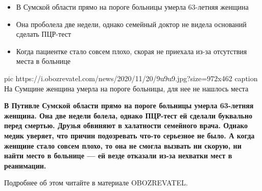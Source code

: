  
 
 

\begin{itemize}
  \item В Сумской области прямо на пороге больницы умерла 63-летняя женщина
  \item Она проболела две недели, однако семейный доктор не видела оснований сделать ПЦР-тест
  \item Когда пациентке стало совсем плохо, скорая не приехала из-за отсутствия места в больнице
\end{itemize}

\ifcmt
pic https://i.obozrevatel.com/news/2020/11/20/9u9u9.jpg?size=972x462
caption На Сумщине женщина умерла на пороге больницы, для нее не нашлось места
\fi

\begin{leftbar}
	\bfseries
В Путивле Сумской области прямо на пороге больницы умерла 63-летняя женщина.
Она две недели болела, однако ПЦР-тест ей сделали буквально перед смертью.
Друзья обвиняют в халатности семейного врача. Однако медик уверяет, что причин
подозревать что-то серьезное не было. А когда женщине стало совсем плохо, то
она не смогла вызвать ни скорую, ни найти место в больнице --- ей везде отказали
из-за нехватки мест в реанимации.

Подробнее об этом читайте в материале OBOZREVATEL.
\end{leftbar}

